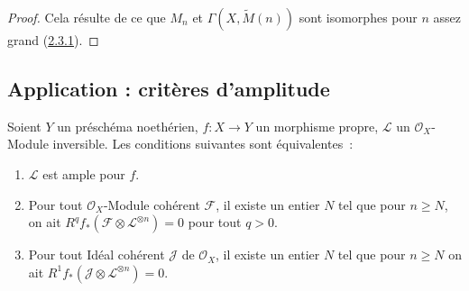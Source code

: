 \begin{proof}
Cela résulte de ce que $M_n$ et $\Gamma(X,\widetilde M(n))$ sont
isomorphes pour $n$ assez grand
(\hyperref[III.2.3.1-fr]{2.3.1}).
\end{proof}

\subsection{Application : critères d'amplitude}
\label{subsection:III.2.6-fr}

\begin{proposition}[2.6.1]
\label{III.2.6.1-fr}
Soient $Y$ un préschéma noethérien, $f:X\to Y$ un morphisme propre,
$\mathcal L$ un $\mathcal O_X$-Module inversible. Les conditions
suivantes sont équivalentes~:
\begin{enumerate}
\item[\textup{a)}] $\mathcal L$ est ample pour $f$.
\item[\textup{b)}] Pour tout $\mathcal O_X$-Module cohérent $\mathcal F$, il
existe un entier $N$ tel que pour $n\geq N$, on ait
$R^qf_*(\mathcal F\otimes\mathcal L^{\otimes n})=0$
pour tout $q>0$.
\item[\textup{c)}] Pour tout Idéal cohérent $\mathcal J$ de $\mathcal O_X$, il
existe un entier $N$ tel que pour $n\geq N$ on ait
$R^1f_*(\mathcal J\otimes\mathcal L^{\otimes n})=0$.
\end{enumerate}
\end{proposition}

